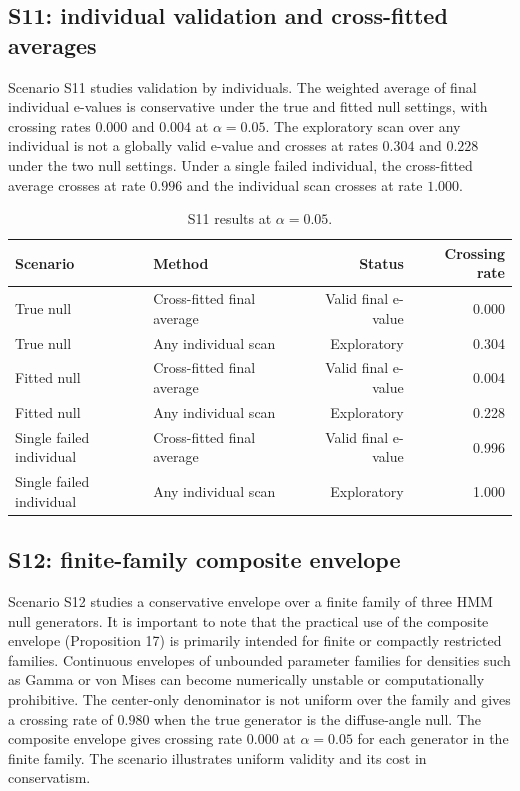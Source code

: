 \documentclass[pdflatex,sn-basic]{sn-jnl}
\newcommand{\1}{\mathbf 1}
\begin{document}
\subsection{S11: individual validation and cross-fitted averages}

Scenario S11 studies validation by individuals. The weighted average of final individual e-values is conservative under the true and fitted null settings, with crossing rates $0.000$ and $0.004$ at $\alpha=0.05$. The exploratory scan over any individual is not a globally valid e-value and crosses at rates $0.304$ and $0.228$ under the two null settings. Under a single failed individual, the cross-fitted average crosses at rate $0.996$ and the individual scan crosses at rate $1.000$.

\begin{table}[h]
\centering
\footnotesize
\begin{tabular}{@{}llrr@{}}
\toprule
Scenario & Method & Status & Crossing rate \\
\midrule
True null & Cross-fitted final average & Valid final e-value & 0.000 \\
True null & Any individual scan & Exploratory & 0.304 \\
Fitted null & Cross-fitted final average & Valid final e-value & 0.004 \\
Fitted null & Any individual scan & Exploratory & 0.228 \\
Single failed individual & Cross-fitted final average & Valid final e-value & 0.996 \\
Single failed individual & Any individual scan & Exploratory & 1.000 \\
\bottomrule
\end{tabular}
\caption{S11 results at $\alpha=0.05$.}
\label{tab:supp_s11}
\end{table}

\subsection{S12: finite-family composite envelope}

Scenario S12 studies a conservative envelope over a finite family of three HMM null generators. It is important to note that the practical use of the composite envelope (Proposition 17) is primarily intended for finite or compactly restricted families. Continuous envelopes of unbounded parameter families for densities such as Gamma or von Mises can become numerically unstable or computationally prohibitive. The center-only denominator is not uniform over the family and gives a crossing rate of $0.980$ when the true generator is the diffuse-angle null. The composite envelope gives crossing rate $0.000$ at $\alpha=0.05$ for each generator in the finite family. The scenario illustrates uniform validity and its cost in conservatism.
\end{document}
